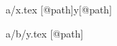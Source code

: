 \begin{filecontents*}{a/x.tex}
[@path]{y}[@path]
\end{filecontents*}
\begin{filecontents*}{a/b/y.tex}
[@path]
\end{filecontents*}
\documentclass{article}
\usepackage{import}

[@path]

